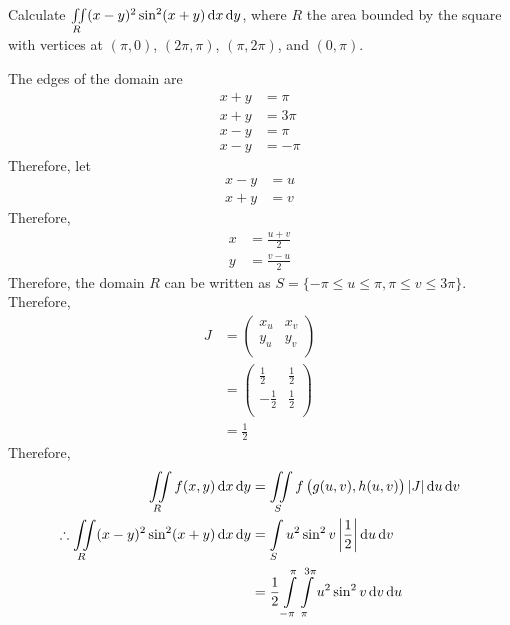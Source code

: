 \documentclass[fleqn, a4paper, 8pt, twoside]{amsart}
\theoremstyle{definition}
\theoremstyle{bluedefinition}
\theoremstyle{redtheorem}
\begin{document}
\begin{multicols}{2}
\begin{spacing}{0.7}
\begin{question}
	Calculate $\iint\limits_{R} (x - y)^2 \sin^2 (x + y) \dif x \dif y$, where $R$ the area bounded by the square with vertices at $(\pi,0)$, $(2 \pi,\pi)$, $(\pi,2 \pi)$, and $(0,\pi)$.
\end{question}

\begin{solution}
	The edges of the domain are
	\begin{align*}
		x + y & = \pi   \\
		x + y & = 3 \pi \\
		x - y & = \pi   \\
		x - y & = -\pi
	\end{align*}
	Therefore, let
	\begin{align*}
		x - y & = u \\
		x + y & = v
	\end{align*}
	Therefore,
	\begin{align*}
		x & = \frac{u + v}{2} \\
		y & = \frac{v - u}{2}
	\end{align*}
	Therefore, the domain $R$ can be written as $S = \{-\pi \le u \le \pi, \pi \le v \le 3 \pi\}$.\\
	Therefore,
	\begin{align*}
		J &=
			\begin{pmatrix}
				x_u & x_v \\
				y_u & y_v \\
			\end{pmatrix}\\
		  &=
			\begin{pmatrix}
				\frac{1}{2}  & \frac{1}{2} \\
				-\frac{1}{2} & \frac{1}{2} \\
			\end{pmatrix}\\
		  &= \frac{1}{2}
	\end{align*}
	Therefore,
	\begin{align*}
		\iint\limits_{R} f(x,y) \dif x \dif y                              & = \iint\limits_{S} f\left( g(u,v), h(u,v) \right) |J| \dif u \dif v                                                   \\
		\therefore \iint\limits_{R} (x - y)^2 \sin^2 (x + y) \dif x \dif y & = \int\limits_{S} u^2 \sin^2 v \left| \frac{1}{2} \right| \dif u \dif v                                               \\
                                                                                   & = \frac{1}{2} \int\limits_{-\pi}^{\pi} \int\limits_{\pi}^{3 \pi} u^2 \sin^2 v \dif v \dif u                           \\

\end{align*}
\end{solution}
\end{spacing}
\end{multicols}
\end{document}
